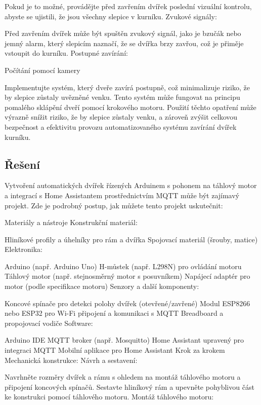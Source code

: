 Pokud je to možné, provádějte před zavřením dvířek poslední vizuální kontrolu, abyste se ujistili, že jsou všechny slepice v kurníku.
Zvukové signály:

Před zavřením dvířek může být spuštěn zvukový signál, jako je bzučák nebo jemný alarm, který slepicím naznačí, že se dvířka brzy zavřou, což je přiměje vstoupit do kurníku.
Postupné zavírání:

Počítání pomocí kamery

Implementujte systém, který dveře zavírá postupně, což minimalizuje riziko, že by slepice zůstaly uvězněné venku. Tento systém může fungovat na principu pomalého sklápění dveří pomocí krokového motoru.
Použití těchto opatření může výrazně snížit riziko, že by slepice zůstaly venku, a zároveň zvýšit celkovou bezpečnost a efektivitu provozu automatizovaného systému zavírání dvířek kurníku.

\subsection{Řešení}\label{subsec:chytra-dvirka-reseni-problemu}
Vytvoření automatických dvířek řízených Arduinem s pohonem na táhlový motor a integrací s Home Assistantem prostřednictvím MQTT může být zajímavý projekt. Zde je podrobný postup, jak můžete tento projekt uskutečnit:

Materiály a nástroje
Konstrukční materiál:

Hliníkové profily a úhelníky pro rám a dvířka
Spojovací materiál (šrouby, matice)
Elektronika:

Arduino (např. Arduino Uno)
H-můstek (např. L298N) pro ovládání motoru
Táhlový motor (např. stejnosměrný motor s posuvníkem)
Napájecí adaptér pro motor (podle specifikace motoru)
Senzory a další komponenty:

Koncové spínače pro detekci polohy dvířek (otevřené/zavřené)
Modul ESP8266 nebo ESP32 pro Wi-Fi připojení a komunikaci s MQTT
Breadboard a propojovací vodiče
Software:

Arduino IDE
MQTT broker (např. Mosquitto)
Home Assistant upravený pro integraci MQTT
Mobilní aplikace pro Home Assistant
Krok za krokem
Mechanická konstrukce:
Návrh a sestavení:

Navrhněte rozměry dvířek a rámu s ohledem na montáž táhlového motoru a připojení koncových spínačů.
Sestavte hliníkový rám a upevněte pohyblivou část ke konstrukci pomocí táhlového motoru.
Montáž táhlového motoru:

